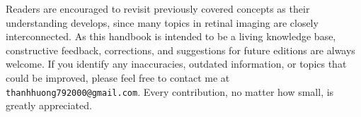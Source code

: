 Readers are encouraged to revisit previously covered concepts as their understanding develops, since many topics in retinal imaging are closely interconnected. As this handbook is intended to be a living knowledge base, constructive feedback, corrections, and suggestions for future editions are always welcome. If you identify any inaccuracies, outdated information, or topics that could be improved, please feel free to contact me at \texttt{thanhhuong792000@gmail.com}. Every contribution, no matter how small, is greatly appreciated.